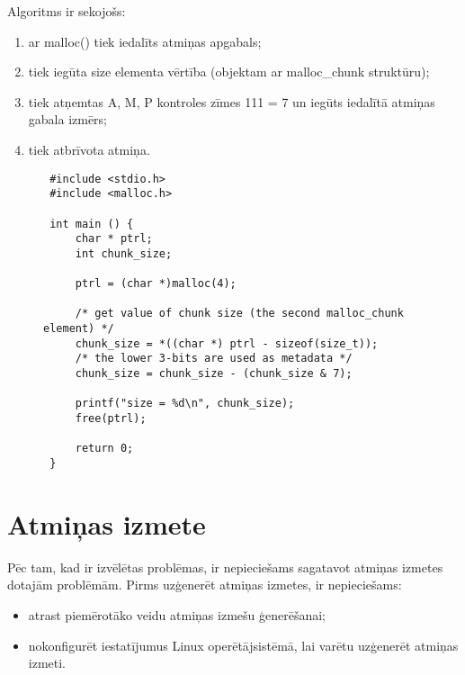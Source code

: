 Algoritms ir sekojošs: 
\begin{enumerate}
\item ar malloc() tiek iedalīts atmiņas apgabals;
\item  tiek iegūta size elementa vērtība (objektam ar malloc\_chunk struktūru);
\item  tiek atņemtas A, M, P kontroles zīmes 111 = 7 un iegūts iedalītā atmiņas  gabala izmērs;
\item  tiek atbrīvota atmiņa.
\end{enumerate}

\begin{figure}[h]
\begin{lstlisting}
 #include <stdio.h>
 #include <malloc.h>

 int main () {
     char * ptrl;
     int chunk_size;

     ptrl = (char *)malloc(4);
 
     /* get value of chunk size (the second malloc_chunk element) */
     chunk_size = *((char *) ptrl - sizeof(size_t));
     /* the lower 3-bits are used as metadata */
     chunk_size = chunk_size - (chunk_size & 7);
 
     printf("size = %d\n", chunk_size);
     free(ptrl);
 
     return 0;
 }
\end{lstlisting}
\caption{\textbf{\fontsize{11}{12}\selectfont {Izmēra noteikšana iedalītām gabalam}}}
\end{figure}




\section{Atmiņas izmete}

Pēc tam, kad ir izvēlētas problēmas, ir nepieciešams sagatavot atmiņas izmetes dotajām problēmām.
Pirms uzģenerēt atmiņas izmetes, ir nepieciešams:
\begin{itemize}
    \item   atrast piemērotāko veidu atmiņas izmešu ģenerēšanai;
    \item   nokonfigurēt iestatījumus Linux operētājsistēmā, lai varētu uzģenerēt atmiņas izmeti.
\end{itemize} 

